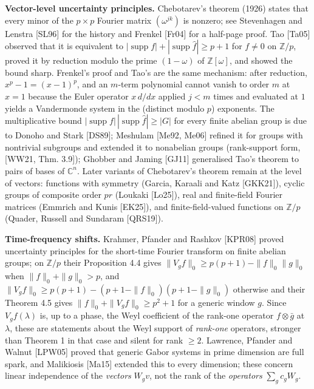 \documentclass[
  11pt,
  a4paper,
]{article}
\begin{document}
\textbf{Vector-level uncertainty principles.} Chebotarev's theorem
(1926) states that every minor of the \(p\times p\) Fourier matrix
\((\omega^{jk})\) is nonzero; see Stevenhagen and Lenstra {[}SL96{]} for
the history and Frenkel {[}Fr04{]} for a half-page proof. Tao {[}Ta05{]}
observed that it is equivalent to
\(|\operatorname{supp}f|+|\operatorname{supp}\hat f|\ge p+1\) for
\(f\ne0\) on \(\mathbb Z/p\), proved it by reduction modulo the prime
\((1-\omega)\) of \(\mathbb Z[\omega]\), and showed the bound sharp.
Frenkel's proof and Tao's are the same mechanism: after reduction,
\(x^p-1=(x-1)^p\), and an \(m\)-term polynomial cannot vanish to order
\(m\) at \(x=1\) because the Euler operator \(x\,\allowbreak{}d/dx\) applied \(j<m\)
times and evaluated at \(1\) yields a Vandermonde system in the
(distinct modulo \(p\)) exponents. The multiplicative bound
\(|\operatorname{supp}f|\,\allowbreak{}|\operatorname{supp}\hat f|\ge|G|\) for every
finite abelian group is due to Donoho and Stark {[}DS89{]}; Meshulam
{[}Me92, Me06{]} refined it for groups with nontrivial subgroups and
extended it to nonabelian groups (rank-support form, {[}WW21, Thm.
3.9{]}); Ghobber and Jaming {[}GJ11{]} generalised Tao's theorem to
pairs of bases of \(\mathbb C^n\). Later variants of Chebotarev's
theorem remain at the level of vectors: functions with symmetry (Garcia,
Karaali and Katz {[}GKK21{]}), cyclic groups of composite order \(pr\)
(Loukaki {[}Lo25{]}), real and finite-field Fourier matrices (Emmrich
and Kunis {[}EK25{]}), and finite-field-valued functions on
\(\mathbb Z/p\) (Quader, Russell and Sundaram {[}QRS19{]}).

\textbf{Time-frequency shifts.} Krahmer, Pfander and Rashkov {[}KPR08{]}
proved uncertainty principles for the short-time Fourier transform on
finite abelian groups; on \(\mathbb Z/p\) their Proposition 4.4 gives
\(\|V_gf\|_0\ge p(p+1)-\|f\|_0\|g\|_0\) when \(\|f\|_0+\|g\|_0>p\), and
\(\|V_gf\|_0\ge p(p+1)-(p+1-\|f\|_0)(p+1-\|g\|_0)\) otherwise and their
Theorem 4.5 gives \(\|f\|_0+\|V_gf\|_0\ge p^2+1\) for a generic window
\(g\). Since \(V_gf(\lambda)\) is, up to a phase, the Weyl coefficient
of the rank-one operator \(f\otimes\bar g\) at \(\lambda\), these are
statements about the Weyl support of \emph{rank-one} operators, stronger
than Theorem 1 in that case and silent for rank \(\ge2\). Lawrence,
Pfander and Walnut {[}LPW05{]} proved that generic Gabor systems in
prime dimension are full spark, and Malikiosis {[}Ma15{]} extended this
to every dimension; these concern linear independence of the
\emph{vectors} \(W_gv\), not the rank of the \emph{operators}
\(\sum_gc_gW_g\).
\end{document}
